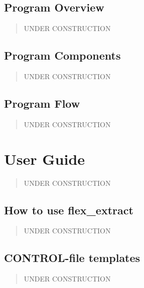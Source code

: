 \documentclass[letterpaper,10pt,english]{sphinxmanual}
\begin{document}
\section{Program Overview}
\label{\detokenize{program_structure/prog_overview:program-overview}}\label{\detokenize{program_structure/prog_overview::doc}}\begin{quote}

UNDER CONSTRUCTION
\end{quote}


\section{Program Components}
\label{\detokenize{program_structure/prog_components:program-components}}\label{\detokenize{program_structure/prog_components::doc}}\begin{quote}

UNDER CONSTRUCTION
\end{quote}


\section{Program Flow}
\label{\detokenize{program_structure/prog_flow:program-flow}}\label{\detokenize{program_structure/prog_flow::doc}}\begin{quote}

UNDER CONSTRUCTION
\end{quote}


\chapter{User Guide}
\label{\detokenize{user_guide:user-guide}}\label{\detokenize{user_guide::doc}}\begin{quote}

UNDER CONSTRUCTION
\end{quote}


\section{How to use flex\_extract}
\label{\detokenize{user_guide/how_to:how-to-use-flex-extract}}\label{\detokenize{user_guide/how_to::doc}}\begin{quote}

UNDER CONSTRUCTION
\end{quote}


\section{CONTROL-file templates}
\label{\detokenize{user_guide/control_templates:control-file-templates}}\label{\detokenize{user_guide/control_templates::doc}}\begin{quote}

UNDER CONSTRUCTION
\end{quote}
\end{document}
